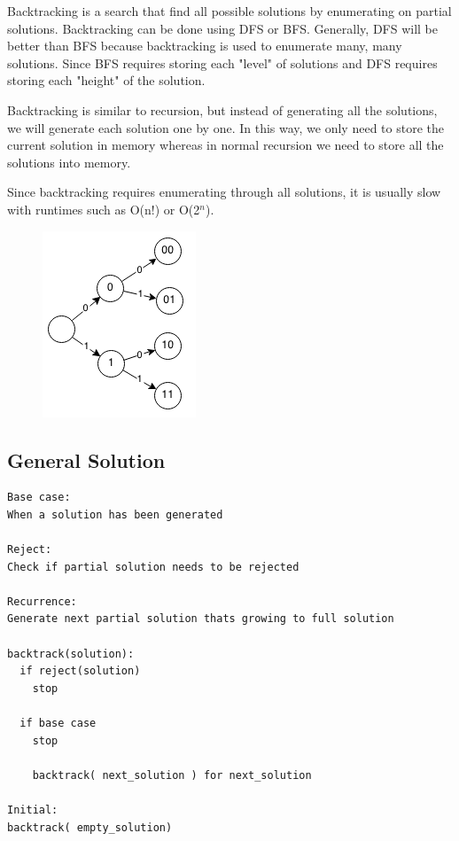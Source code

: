 \documentclass[11pt,oneside]{book}
\makeatletter
\def\maxwidth#1{\ifdim\Gin@nat@width>#1 #1\else\Gin@nat@width\fi}
\makeatother
\begin{document}
Backtracking is a search that find all possible solutions by enumerating on partial solutions. Backtracking can be done using DFS or BFS. Generally, DFS will be better than BFS because backtracking is used to enumerate many, many solutions. Since BFS requires storing each "level" of solutions and DFS requires storing each "height" of the solution.

Backtracking is similar to recursion, but instead of generating all the solutions, we will generate each solution one by one. In this way, we only need to store the current solution in memory whereas in normal recursion we need to store all the solutions into memory.

Since backtracking requires enumerating through all solutions, it is usually slow with runtimes such as O(n!) or O(2$^{n}$).

\vspace{5px}\begin{figure}[H]\centering
        \includegraphics[width=0.66\maxwidth{\textwidth}]{backtracking.png}
        \end{figure}

\subsection{General Solution}

\begin{lstlisting}
Base case:
When a solution has been generated

Reject:
Check if partial solution needs to be rejected

Recurrence:
Generate next partial solution thats growing to full solution

backtrack(solution):
  if reject(solution)
    stop

  if base case
    stop

    backtrack( next_solution ) for next_solution

Initial:
backtrack( empty_solution)
\end{lstlisting}
\end{document}
